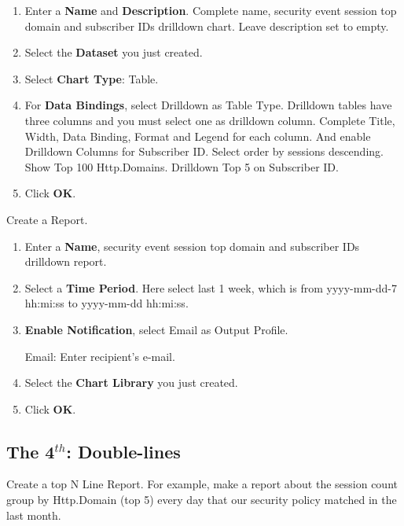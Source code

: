 \begin{description}
\begin{enumerate}
        \item Enter a \textbf{Name} and \textbf{Description}. Complete name, security event session top domain and subscriber IDs drilldown chart. Leave description set to empty. 
        \item Select the \textbf{Dataset} you just created.
        \item Select \textbf{Chart Type}: Table. 
        \item For \textbf{Data Bindings}, select Drilldown as Table Type. Drilldown tables have three columns and you must select one as drilldown column. Complete Title, Width, Data Binding, Format and Legend for each column. And enable Drilldown Columns for Subscriber ID. Select order by sessions descending. Show Top 100 Http.Domains. Drilldown Top 5 on Subscriber ID.
        \item Click \textbf{OK}.
    \end{enumerate}
    \item[STEP 3.]	Create a Report. 
    \begin{enumerate}
        \item Enter a \textbf{Name}, security event session top domain and subscriber IDs drilldown report.
        \item Select a \textbf{Time Period}. Here select last 1 week, which is from yyyy-mm-dd-7 hh:mi:ss to yyyy-mm-dd hh:mi:ss.
        \item \textbf{Enable Notification}, select Email as Output Profile. 
        

              Email: Enter recipient's e-mail.
        \item Select the \textbf{Chart Library} you just created.
        \item Click \textbf{OK}.
    \end{enumerate}
\end{description}

\subsection*{\hypertarget{link:The 4th: Double-lines}{The 4$^{th}$: Double-lines}}
\label{sec:appendix_f:report:double-lines}

Create a top N Line Report. For example, make a report about the session count group by Http.Domain (top 5) every day that our security policy matched in the last month.

